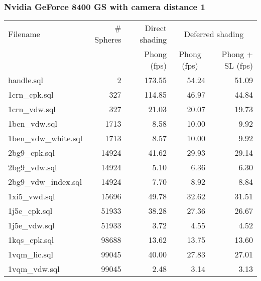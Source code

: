 \subsubsection*{Nvidia GeForce 8400 GS with camera distance 1}
\begin{tabular}{|l|r|r|r|r|}
\hline
Filename & \# Spheres & Direct shading & \multicolumn{2}{|c|}{Deferred shading} \\
         &            & Phong (fps)    & \multicolumn{1}{|c}{Phong (fps)} & Phong + SL (fps) \\  
\hline
\hline
handle.sql & 2 & 173.55 & 54.24 & 51.09 \\
\hline
1crn\_cpk.sql & 327 & 114.85 & 46.97 & 44.84 \\
\hline
1crn\_vdw.sql & 327 & 21.03 & 20.07 & 19.73 \\
\hline
1ben\_vdw.sql & 1713 & 8.58 & 10.00 & 9.92 \\
\hline
1ben\_vdw\_white.sql & 1713 & 8.57 & 10.00 & 9.92 \\
\hline
2bg9\_cpk.sql & 14924 & 41.62 & 29.93 & 29.14 \\
\hline
2bg9\_vdw.sql & 14924 & 5.10 & 6.36 & 6.30 \\
\hline
2bg9\_vdw\_index.sql & 14924 & 7.70 & 8.92 & 8.84 \\
\hline
1xi5\_vwd.sql & 15696 & 49.78 & 32.62 & 31.51 \\
\hline
1j5e\_cpk.sql & 51933 & 38.28 & 27.36 & 26.67 \\
\hline
1j5e\_vdw.sql & 51933 & 3.72 & 4.55 & 4.52 \\
\hline
1kqs\_cpk.sql & 98688 & 13.62 & 13.75 & 13.60 \\
\hline
1vqm\_lic.sql & 99045 & 40.00 & 27.83 & 27.01 \\
\hline
1vqm\_vdw.sql & 99045 & 2.48 & 3.14 & 3.13 \\
\hline
\end{tabular}
